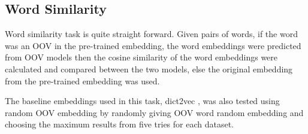     \subsection{Word Similarity}
        Word similarity task is quite straight forward. Given pairs of
        words, if the word was an OOV in the pre-trained embedding, the
        word embeddings were predicted from OOV models then the cosine
        similarity of the word embeddings were calculated and compared
        between the two models, else the original embedding from the
        pre-trained embedding was used. 

        The baseline embeddings used in this task, dict2vec
        \citep{dict2vect2017tissier}, was also tested using random OOV
        embedding by randomly giving OOV word random embedding and
        choosing the maximum results from five tries for each dataset.